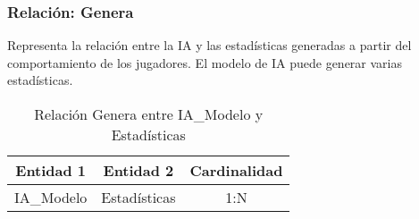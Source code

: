 \subsubsection{Relación: Genera}
Representa la relación entre la IA y las estadísticas generadas a partir del comportamiento de los jugadores. El modelo de IA puede generar varias estadísticas.
\begin{table}[H]
\centering
\begin{tabular}{|c|c|c|}
\hline
\textbf{Entidad 1} & \textbf{Entidad 2} & \textbf{Cardinalidad} \\ \hline
IA\_Modelo & Estadísticas & 1:N \\ \hline
\end{tabular}
\caption{Relación Genera entre IA\_Modelo y Estadísticas}
\end{table}
